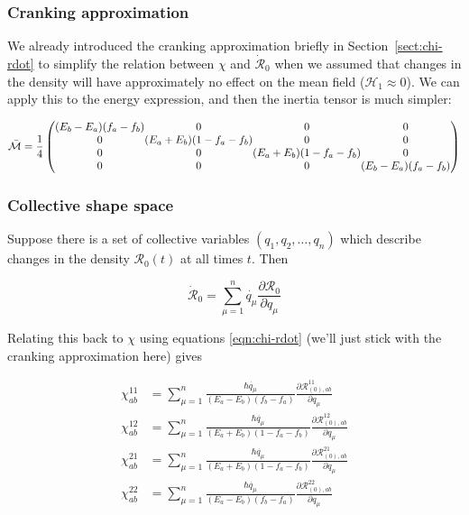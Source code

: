 \subsubsection{Cranking approximation}

We already introduced the cranking approximation briefly in Section~\ref{sect:chi-rdot} to simplify the relation between $\chi$ and $\mathcal{\dot{R}}_0$ when we assumed that changes in the density will have approximately no effect on the mean field ($\mathcal{H}_1 \approx 0$). We can apply this to the energy expression, and then the inertia tensor is much simpler:

\begin{equation}\label{eqn:cranked_ATDHFB}
\mathcal{\bar{M}} = \frac{1}{4}\left(\begin{array}{@{}c@{}c@{}c@{}c@{}}
(E_b-E_a)(f_a-f_b) & 0                     & 0                     & 0 \\
0                  & (E_a+E_b)(1-f_a-f_b) & 0                     & 0 \\
0                  & 0                     & (E_a+E_b)(1-f_a-f_b)  & 0 \\
0                  & 0                     & 0                     & (E_b-E_a)(f_a-f_b)
\end{array}\right)
\end{equation}

\subsubsection{Collective shape space}

Suppose there is a set of collective variables $(q_1,q_2,\dots,q_n)$ which describe changes in the density $\mathcal{R}_0(t)$ at all times $t$. Then

\begin{equation}
\mathcal{\dot{R}}_0 = \sum_{\mu=1}^{n}\dot{q_\mu}\frac{\partial\mathcal{R}_0}{\partial q_\mu}
\end{equation}

\noindent Relating this back to $\chi$ using equations \eqref{eqn:chi-rdot} (we'll just stick with the cranking approximation here) gives

\begin{align}
\chi^{11}_{ab} &= \sum_{\mu=1}^{n}\frac{\hbar\dot{q_\mu}}{(E_a-E_b)(f_b-f_a)}\frac{\partial\mathcal{R}^{11}_{(0),ab}}{\partial q_\mu} \\
\chi^{12}_{ab} &= \sum_{\mu=1}^{n}\frac{\hbar\dot{q_\mu}}{(E_a+E_b)(1-f_a-f_b)}\frac{\partial\mathcal{R}^{12}_{(0),ab}}{\partial q_\mu} \\
\chi^{21}_{ab} &= \sum_{\mu=1}^{n}\frac{\hbar\dot{q_\mu}}{(E_a+E_b)(1-f_a-f_b)}\frac{\partial\mathcal{R}^{21}_{(0),ab}}{\partial q_\mu} \\
\chi^{22}_{ab} &= \sum_{\mu=1}^{n}\frac{\hbar\dot{q_\mu}}{(E_a-E_b)(f_b-f_a)}\frac{\partial\mathcal{R}^{22}_{(0),ab}}{\partial q_\mu} \\
\end{align}

